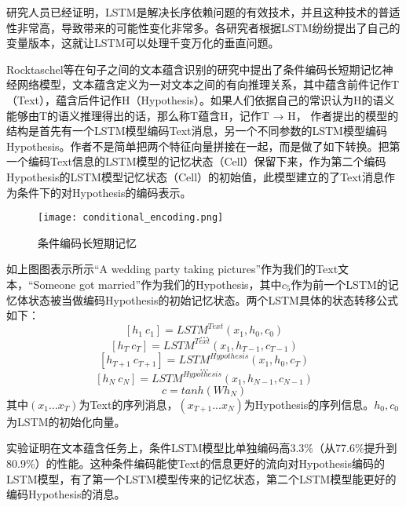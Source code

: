 研究人员已经证明，LSTM是解决长序依赖问题的有效技术，并且这种技术的普适性非常高，导致带来的可能性变化非常多。各研究者根据LSTM纷纷提出了自己的变量版本，这就让LSTM可以处理千变万化的垂直问题。

Rocktaschel等在句子之间的文本蕴含识别的研究中提出了条件编码长短期记忆神经网络模型，文本蕴含定义为一对文本之间的有向推理关系，其中蕴含前件记作T（Text），蕴含后件记作H（Hypothesis）。如果人们依据自己的常识认为H的语义能够由T的语义推理得出的话，那么称T蕴含H，记作T → H， 作者提出的模型的结构是首先有一个LSTM模型编码Text消息，另一个不同参数的LSTM模型编码Hypothesis。作者不是简单把两个特征向量拼接在一起，而是做了如下转换。把第一个编码Text信息的LSTM模型的记忆状态（Cell）保留下来，作为第二个编码Hypothesis的LSTM模型记忆状态（Cell）的初始值，此模型建立的了Text消息作为条件下的对Hypothesis的编码表示。

\begin{figure}[htbp]
	\centering
	\texttt{[image: conditional\_encoding.png]}
	\caption[rnn_vanish]{条件编码长短期记忆}
\end{figure}

如上图图表示所示“A wedding party taking pictures”作为我们的Text文本，“Someone got married”作为我们的Hypothesis，其中$c_5$作为前一个LSTM的记忆体状态被当做编码Hypothesis的初始记忆状态。两个LSTM具体的状态转移公式如下：
\begin{equation}\label{lstm_f}[h_1~c_1] = LSTM^{Text}(x_1,h_0,c_0)\end{equation}
$$...$$
\begin{equation}\label{lstm_f}[h_T~c_T] = LSTM^{Text}(x_1,h_{T-1},c_{T-1})\end{equation}
\begin{equation}\label{lstm_f}[h_{T+1}~c_{T+1}] = LSTM^{Hypothesis}(x_1,h_0,c_T)\end{equation}
$$...$$
\begin{equation}\label{lstm_f}[h_{N}~c_{N}] = LSTM^{Hypothesis}(x_1,h_{N-1},c_{N-1})\end{equation}
\begin{equation}\label{lstm_f}c=tanh(Wh_N)\end{equation}
其中$(x_1...x_T)$为Text的序列消息，$(x_{T+1}...x_N)$为Hypothesis的序列信息。$h_0,c_0$为LSTM的初始化向量。

实验证明在文本蕴含任务上，条件LSTM模型比单独编码高3.3\%（从77.6\%提升到80.9\%）的性能。这种条件编码能使Text的信息更好的流向对Hypothesis编码的LSTM模型，有了第一个LSTM模型传来的记忆状态，第二个LSTM模型能更好的编码Hypothesis的消息。

